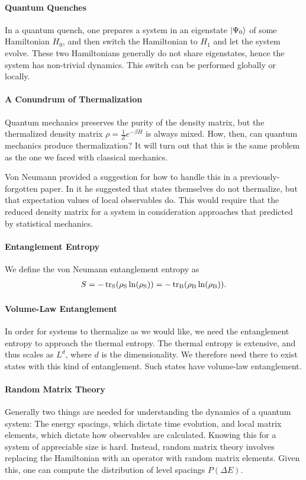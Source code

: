 \paragraph{Quantum Quenches}
In a quantum quench, one prepares a system in an eigenstate $\ket{\Psi_{0}}$ of some Hamiltonian $H_{0}$, and then switch the Hamiltonian to $H_{1}$ and let the system evolve. These two Hamiltonians generally do not share eigenstates, hence the system has non-trivial dynamics. This switch can be performed globally or locally.

\paragraph{A Conundrum of Thermalization}
Quantum mechanics preserves the purity of the density matrix, but the thermalized density matrix $\rho = \frac{1}{Z}e^{-\beta H}$ is always mixed. How, then, can quantum mechanics produce thermalization? It will turn out that this is the same problem as the one we faced with classical mechanics.

Von Neumann provided a suggestion for how to handle this in a previously-forgotten paper. In it he suggested that states themselves do not thermalize, but that expectation values of local observables do. This would require that the reduced density matrix for a system in consideration approaches that predicted by statistical mechanics.

\paragraph{Entanglement Entropy}
We define the von Neumann entanglement entropy as
\begin{align*}
	S = -\tr_{\text{S}}(\rho_{\text{S}}\ln(\rho_{\text{S}})) = -\tr_{\text{B}}(\rho_{\text{B}}\ln(\rho_{\text{B}})).
\end{align*}

\paragraph{Volume-Law Entanglement}
In order for systems to thermalize as we would like, we need the entanglement entropy to approach the thermal entropy. The thermal entropy is extensive, and thus scales as $L^{d}$, where $d$ is the dimensionality. We therefore need there to exist states with this kind of entanglement. Such states have volume-law entanglement.

\paragraph{Random Matrix Theory}
Generally two things are needed for understanding the dynamics of a quantum system: The energy spacings, which dictate time evolution, and local matrix elements, which dictate how observables are calculated. Knowing this for a system of appreciable size is hard. Instead, random matrix theory involves replacing the Hamiltonian with an operator with random matrix elements. Given this, one can compute the distribution of level spacings $P(\Delta E)$.

